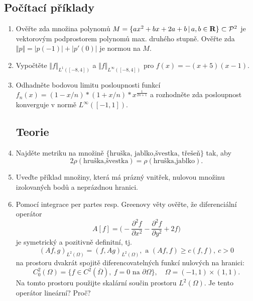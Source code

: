\documentclass[a4paper,10pt]{article}
\def\Real{{\rm\bf R}}
\def\abs#1{\lvert#1\rvert}
\def\norm#1{\bigl\Vert#1\bigr\Vert} %
\def\close#1{\overline{#1}}
\def\where{\,|\,}                    %
\def\prtl{\partial}                                        %
\begin{document}
\subsection{Počítací příklady}
\begin{enumerate}
 \item Ověřte zda množina polynomů $M=\{ax^2+bx+2a+b\where a,b\in\Real\}\subset \mathcal P^2$ je vektorovým podprostorem 
        polynomů max. druhého stupně. 
       Ověřte zda $\norm{p}=\abs{p(-1)}+\abs{p'(0)}$ je normou na $M$.
 \item Vypočtěte $\norm{f}_{L^1([-8,4])}$ a $\norm{f}_{L^\infty([-8,4])}$ pro $f(x)=-(x+5)(x-1)$.
\item Odhadněte bodovou limitu posloupnosti funkcí  $f_n(x)= (1-x/n)*(1+x/n)*x^{\frac{1}{2n+1}}$ 
  a rozhodněte zda posloupnost konverguje v normě $L^\infty([-1,1])$.

\pagebreak
\subsection{Teorie}
\item Najděte metriku na množině $\{\text{hruška, jablko,švestka, třešeň}\}$ tak, aby \[2\rho(\text{hruška,švestka})=\rho(\text{hruška,jablko}).\]
\item Uveďte příklad množiny, která má prázný vnitřek, nulovou množinu izolovaných bodů a neprázdnou hranici.
\item 
Pomocí integrace per partes resp. Greenovy věty ověřte, že diferenciální operátor 
\[
A[f]=\big(-\frac{\prtl^2 f}{\prtl x^2} -\frac{\prtl^2 f}{\prtl y^2} + 2 f\big)
\]
je symetrický a pozitivně definitní, tj. 
\[
    (Af,g)_{L^2(\Omega)}=(f,Ag)_{L^2(\Omega)},\text{ a } (Af,f) \ge c(f,f),\ c>0
\]
na prostoru dvakrát spojitě diferencovatelných funkcí nulových na hranici:
\[
C^2_0(\Omega)=\{ f\in C^2(\close{\Omega}),\ f=0 \text{ na }\prtl\Omega\},\quad \Omega=(-1,1)\times(1,1).
\]
Na tomto prostoru použijte skalární součin prostoru $L^2(\Omega)$. Je tento operátor lineární? Proč?
\end{enumerate}
\end{document}
